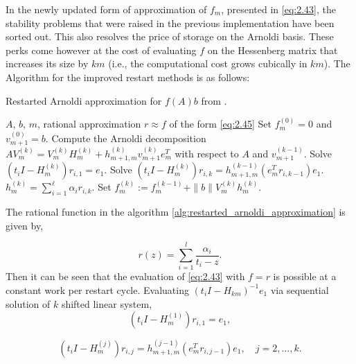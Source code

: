 In the newly updated form of approximation of $f_{m}$, presented in \eqref{eq:2.43}, the stability problems that were raised in the previous implementation have been sorted out. This also resolves the price of storage on the Arnoldi basis. These perks come however at the cost of evaluating $f$ on the Hessenberg matrix that increases its size by $km$ (i.e., the computational cost grows cubically in $km$). The Algorithm for the improved restart methods is as follows:

\begin{algorithm}[H]
    \caption{Restarted Arnoldi approximation for $f(A)b$ from \cite{59}.}
    \label{alg:restarted_arnoldi_approximation}
    \begin{algorithmic}[1]
    \REQUIRE $A$, $b$, $m$, rational approximation $r \approx f$ of the form \eqref{eq:2.45}
    \STATE Set $f^{(0)}_m = 0$ and $v^{(0)}_{m+1} = b$.
        \STATE Compute the Arnoldi decomposition $AV^{(k)}_m = V^{(k)}_m H^{(k)}_m + h^{(k)}_{m+1,m} v^{(k)}_{m+1} e_m^T$ with respect to $A$ and $v^{(k-1)}_{m+1}$.
                \STATE Solve $(t_i I - H^{(k)}_m) r_{i,1} = e_1$.
            \ENDFOR
        \ELSE
                \STATE Solve $(t_i I - H^{(k)}_m) r_{i,k} = h^{(k-1)}_{m+1,m} (e_m^T r_{i,k-1}) e_1$.
            \ENDFOR
        \ENDIF
        \STATE $h^{(k)}_m = \sum_{i=1}^{\ell} \alpha_i r_{i,k}$.
        \STATE Set $f^{(k)}_m := f^{(k-1)}_m + \|b\|V^{(k)}_m h^{(k)}_m$.
    \ENDFOR
    \end{algorithmic}
\end{algorithm}

The rational function in the algorithm \ref{alg:restarted_arnoldi_approximation} is given by,

\begin{equation}
    r(z) = \sum_{i=1}^{l} \frac{\alpha_{i}}{t_{i} - z}.
    \label{eq:2.45}
\end{equation}
Then it can be seen that the evaluation of \eqref{eq:2.43} with $f=r$ is possible at a constant work per restart cycle. Evaluating $(t_{i} I - H_{km})^{-1} e_{1}$ via sequential solution of $k$ shifted linear system,
\begin{equation}
    (t_{i} I - H^{(1)}_{m}) r_{i,1} = e_{1}, 
    \label{eq:2.46}
\end{equation}

\begin{equation}
    (t_{i} I - H^{(j)}_{m}) r_{i,j} = h^{(j-1)}_{m+1,m} (e_{m}^{T} r_{i,j-1}) e_{1}, \quad j = 2, \ldots, k.
    \label{eq:2.47}
\end{equation}

